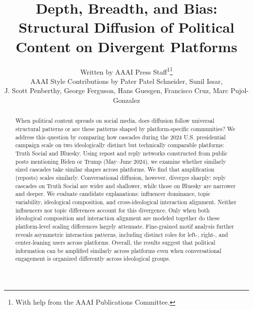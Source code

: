 \documentclass[letterpaper]{article} %
\title{Depth, Breadth, and Bias: Structural Diffusion of Political Content on Divergent Platforms}
\author{
    Written by AAAI Press Staff\textsuperscript{\rm 1}\thanks{With help from the AAAI Publications Committee.}\\
    AAAI Style Contributions by Pater Patel Schneider,
    Sunil Issar,\\
    J. Scott Penberthy,
    George Ferguson,
    Hans Guesgen,
    Francisco Cruz\equalcontrib,
    Marc Pujol-Gonzalez\equalcontrib
}
\newcommand{\rev}[1]{{\color{blue}#1}}
\begin{document}
\maketitle

\begin{abstract}

When political content spreads on social media, does diffusion follow universal structural patterns or are these patterns shaped by platform-specific communities? We address this question by comparing how cascades during the 2024 U.S. presidential campaign scale on two ideologically distinct but technically comparable platforms: Truth Social and Bluesky. Using repost and reply networks constructed from public posts mentioning Biden or Trump (May–June 2024), we examine whether similarly sized cascades take similar shapes across platforms. We find that amplification (reposts) scales similarly. Conversational diffusion, however, diverges sharply: reply cascades on Truth Social are wider and shallower, while those on Bluesky are narrower and deeper. We evaluate candidate explanations: influencer dominance, topic variability, ideological composition, and cross-ideological interaction alignment. Neither influencers nor topic differences account for this divergence. Only when both ideological composition and interaction alignment are modeled together \rev{do these platform-level scaling differences largely attenuate.} 
Fine-grained motif analysis further reveals asymmetric interaction patterns, including distinct roles for left-, right-, and center-leaning users across platforms. \rev{Overall, the results suggest that political information can be amplified similarly across platforms even when conversational engagement is organized differently across ideological groups.}

\end{abstract}
\end{document}

